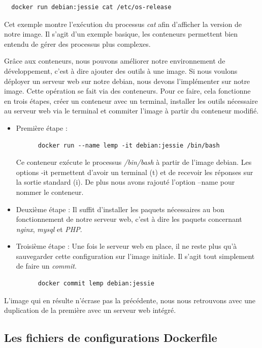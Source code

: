\documentclass[12pt,a4paper]{article}
\begin{document}
\begin{lstlisting}
  docker run debian:jessie cat /etc/os-release
\end{lstlisting}
Cet exemple montre l'exécution du processus \textit{cat} afin d'afficher la version de notre image. Il s'agit d'un exemple basique, les conteneurs permettent bien entendu de gérer des processus plus complexes.

Grâce aux conteneurs, nous pouvons améliorer notre environnement de développement, c'est à dire ajouter des outils à une image. Si nous voulons déployer un serveur web sur notre debian, nous devons l'implémenter sur notre image. Cette opération se fait via des conteneurs. Pour ce faire, cela fonctionne en trois étapes, créer un conteneur avec un terminal, installer les outils nécessaire au serveur web via le terminal et commiter l'image à partir du conteneur modifié.

\begin{itemize}
  \item{Première étape :}
    \begin{lstlisting}
      docker run --name lemp -it debian:jessie /bin/bash
    \end{lstlisting}
    Ce conteneur exécute le processus \textit{/bin/bash} à partir de l'image debian. Les options -it permettent d'avoir un terminal (t) et de recevoir les réponses sur la sortie standard (i). De plus nous avons rajouté l'option --name pour nommer le conteneur.

  \item{Deuxième étape :}
    Il suffit d'installer les paquets nécessaires au bon fonctionnement de notre serveur web, c'est à dire les paquets concernant \textit{nginx}, \textit{mysql} et \textit{PHP}.

  \item{Troisième étape :}
    Une fois le serveur web en place, il ne reste plus qu'à sauvegarder cette configuration sur l'image initiale. Il s'agit tout simplement de faire un \textit{commit}.
    \begin{lstlisting}
      docker commit lemp debian:jessie
    \end{lstlisting}
\end{itemize}

L'image qui en résulte n'écrase pas la précédente, nous nous retrouvons avec une duplication de la première avec un serveur web intégré.

\subsection{Les fichiers de configurations Dockerfile}
\end{document}
